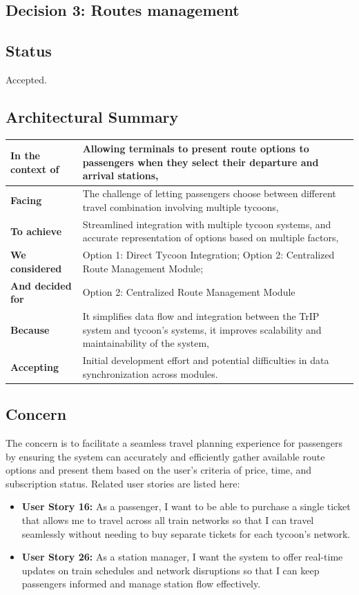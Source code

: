 \subsection{Decision 3: Routes management}

\subsection*{Status}
Accepted.

\subsection*{Architectural Summary}
\begin{tabular}{|p{3.5cm}|p{10.5cm}|}
    \hline
    \textbf{In the context of} & Allowing terminals to present route options to passengers when they select their departure and arrival stations, \\
    \hline
    \textbf{Facing} & The challenge of letting passengers choose between different travel combination involving multiple tycoons, \\
    \hline
    \textbf{To achieve} & Streamlined integration with multiple tycoon systems, and accurate representation of options based on multiple factors, \\
    \hline
    \textbf{We considered} & Option 1: Direct Tycoon Integration; Option 2: Centralized Route Management Module; \\
    \hline
    \textbf{And decided for} & Option 2: Centralized Route Management Module \\
    \hline
    \textbf{Because} & It simplifies data flow and integration between the TrIP system and tycoon's systems, it improves scalability and maintainability of the system, \\
    \hline
    \textbf{Accepting} & Initial development effort and potential difficulties in data synchronization across modules. \\
    \hline
\end{tabular}

\subsection*{Concern}
The concern is to facilitate a seamless travel planning experience for passengers by ensuring the system can accurately and efficiently gather available route options and present them based on the user's criteria of price, time, and subscription status.
Related user stories are listed here:
\begin{itemize}
    \item \textbf{User Story 16:} As a passenger, I want to be able to purchase a single ticket that allows me to travel across all train networks so that I can travel seamlessly without needing to buy separate tickets for each tycoon's network.
    \item \textbf{User Story 26:} As a station manager, I want the system to offer real-time updates on train schedules and network disruptions so that I can keep passengers informed and manage station flow effectively.
\end{itemize}

